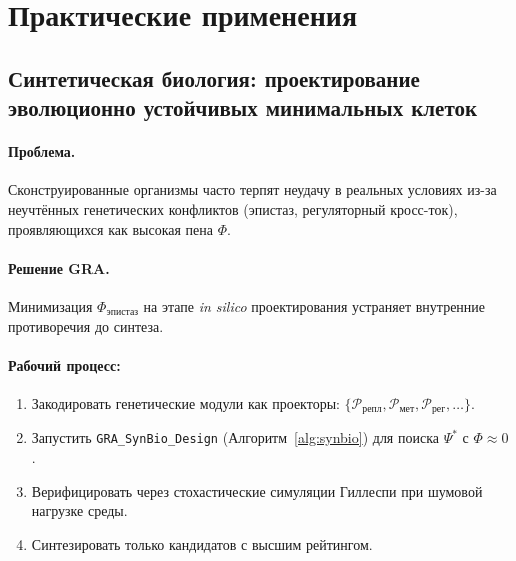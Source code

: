 \documentclass[11pt,a4paper]{article}
\theoremstyle{plain}
\theoremstyle{definition}
\theoremstyle{remark}
\newcommand{\Foam}{\Phi}
\newcommand{\Projector}{\mathcal{P}}
\begin{document}
\section{Практические применения}
\label{sec:applications}

\subsection{Синтетическая биология: проектирование эволюционно устойчивых минимальных клеток}

\paragraph{Проблема.} Сконструированные организмы часто терпят неудачу в реальных условиях из-за неучтённых генетических конфликтов (эпистаз, регуляторный кросс-ток), проявляющихся как высокая пена $\Foam$.

\paragraph{Решение GRA.} Минимизация $\Foam_{\text{эпистаз}}$ на этапе \textit{in silico} проектирования устраняет внутренние противоречия до синтеза.

\paragraph{Рабочий процесс:}
\begin{enumerate}
    \item Закодировать генетические модули как проекторы: $\{\Projector_{\text{репл}}, \Projector_{\text{мет}}, \Projector_{\text{рег}}, \dots\}$.
    \item Запустить \texttt{GRA\_SynBio\_Design} (Алгоритм~\ref{alg:synbio}) для поиска $\Psi^*$ с $\Foam \approx 0$.
    \item Верифицировать через стохастические симуляции Гиллеспи при шумовой нагрузке среды.
    \item Синтезировать только кандидатов с высшим рейтингом.
\end{enumerate}
\end{document}
